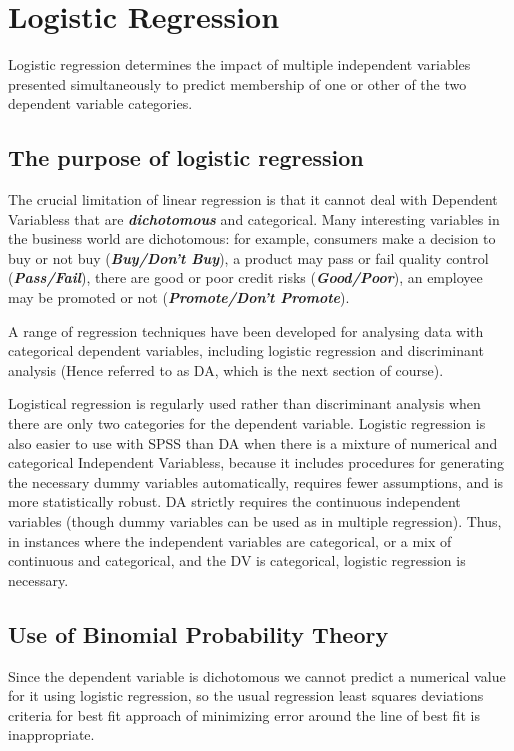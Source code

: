 \documentclass[a4paper,12pt]{article}
\begin{document}
\tableofcontents
\newpage
\section{Logistic Regression}
Logistic regression determines the impact of multiple independent variables
presented simultaneously to predict membership of one or other of the two
dependent variable categories.

\subsection{The purpose of logistic regression}
The crucial limitation of linear regression is that it cannot deal with Dependent Variabless that are \textbf{\textit{dichotomous}} and categorical. Many interesting variables in the business world are dichotomous: for
example, consumers make a decision to buy or not buy (\textit{\textbf{Buy/Don't Buy}}), a product may pass or fail quality control (\textit{\textbf{Pass/Fail}}), there are good or poor credit risks (\textit{\textbf{Good/Poor}}), an employee may be promoted or not (\textit{\textbf{Promote/Don't Promote}}).


A range of regression techniques have been developed for analysing data with categorical dependent
variables, including logistic regression and discriminant analysis (Hence referred to as DA, which is the next section of course).

Logistical regression is regularly used rather than discriminant analysis when there are only two categories
for the dependent variable. Logistic regression is also easier to use with SPSS than DA when
there is a mixture of numerical and categorical Independent Variabless, because it includes procedures for
generating the necessary dummy variables automatically, requires fewer assumptions, and
is more statistically robust. DA strictly requires the continuous independent variables  (though dummy variables can be used as in multiple regression). Thus, in instances where
the independent variables are categorical, or a mix of continuous and categorical, and the
DV is categorical, logistic regression is necessary.

\subsection{Use of Binomial Probability Theory}
Since the dependent variable is dichotomous we cannot predict a numerical value for it
using logistic regression, so the usual regression least squares deviations criteria for best fit
approach of minimizing error around the line of best fit is inappropriate.
\end{document}

